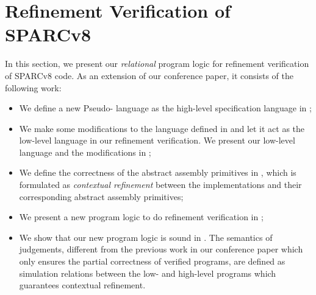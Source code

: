 \section{Refinement Verification of SPARCv8}
\label{sec:refine-verification-sparc}

In this section, we present our \textit{relational}
program logic for refinement verification of
SPARCv8 code. %
As an extension of our conference paper,
it consists of the following work:
\begin{itemize}
    \item We define a new Pseudo-\sparc{} language
        as the high-level
        specification language in
        \Sec{\ref{subsec:High-level Pseudo-SPARCv8 Language}};
    \item We make some modifications to the \sparc{}
        language defined in \Sec{\ref{sec:modeling}} and
        let it act as the low-level language in our refinement
        verification. We present our low-level \sparc{}
        language and the modifications in
        \Sec{\ref{subsec:low-level SPARCv8 Program}};
    \item We define the correctness of the abstract
        assembly primitives in
        \Sec{\ref{subsec:correctness-primitive}},
        which is formulated as \textit{contextual refinement}
        between the implementations and their
        corresponding abstract assembly primitives;
    \item We present a new program logic to do
        refinement verification in
        \Sec{\ref{subsec:rellogic}};
    \item We show that our new program logic is
        sound in \Sec{\ref{subsec:semantics and soundness}}.
        The semantics of judgements,
        different from the previous work
        in our conference paper which only ensures the
        partial correctness of verified programs,
        are defined as simulation relations
        between the low- and high-level programs
        which guarantees contextual refinement.
\end{itemize}

